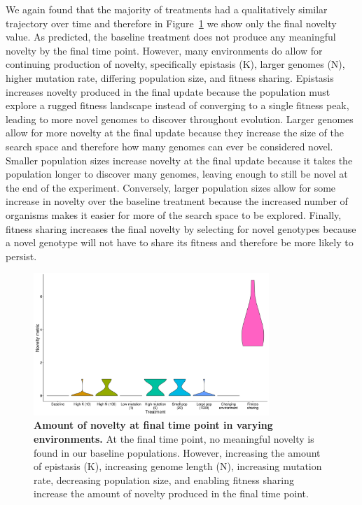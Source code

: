 \documentclass[letterpaper]{article}
\begin{document}
We again found that the majority of treatments had a qualitatively similar trajectory over time and therefore in Figure~\ref{novelty} we show only the final novelty value. As predicted, the baseline treatment does not produce any meaningful novelty by the final time point. However, many environments do allow for continuing production of novelty, specifically epistasis (K), larger genomes (N), higher mutation rate, differing population size, and fitness sharing. Epistasis increases novelty produced in the final update because the population must explore a rugged fitness landscape instead of converging to a single fitness peak, leading to more novel genomes to discover throughout evolution. Larger genomes allow for more novelty at the final update because they increase the size of the search space and therefore how many genomes can ever be considered novel. Smaller population sizes increase novelty at the final update because it takes the population longer to discover many genomes, leaving enough to still be novel at the end of the experiment. Conversely, larger population sizes allow for some increase in novelty over the baseline treatment because the increased number of organisms makes it easier for more of the search space to be explored. Finally, fitness sharing increases the final novelty by selecting for novel genotypes because a novel genotype will not have to share its fitness and therefore be more likely to persist.

\begin{figure}
\includegraphics[width=3.5in]{figs/noveltyboxplots.png}
\caption{\textbf{Amount of novelty at final time point in varying environments.} At the final time point, no meaningful novelty is found in our baseline populations. However, increasing the amount of epistasis (K), increasing genome length (N), increasing mutation rate, decreasing population size, and enabling fitness sharing increase the amount of novelty produced in the final time point.}
\label{novelty}
\end{figure}
\end{document}
